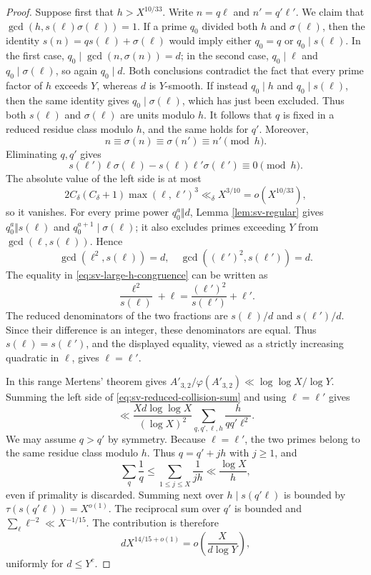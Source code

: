 \documentclass[11pt,letterpaper,reqno]{amsart}
\numberwithin{equation}{section}
\theoremstyle{remark}
\newcommand{\1}{\mathbf 1}
\renewcommand{\leq}{\leqslant}
\renewcommand{\geq}{\geqslant}
\begin{document}
\begin{proof}
Suppose first that $h>X^{10/33}$. Write $n=q\ell$ and $n'=q'\ell'$. We claim that
$\gcd(h,s(\ell)\sigma(\ell))=1$. If a prime $q_0$ divided both $h$
and $\sigma(\ell)$, then the identity
$s(n)=q s(\ell)+\sigma(\ell)$ would imply either $q_0=q$ or
$q_0\mid s(\ell)$. In the first case,
$q_0\mid\gcd(n,\sigma(n))=d$; in the second case,
$q_0\mid\ell$ and $q_0\mid\sigma(\ell)$, so again $q_0\mid d$.
Both conclusions contradict the fact that every prime factor of $h$ exceeds
$Y$, whereas $d$ is $Y$-smooth. If instead $q_0\mid h$ and
$q_0\mid s(\ell)$, then the same identity gives
$q_0\mid\sigma(\ell)$, which has just been excluded. Thus both
$s(\ell)$ and $\sigma(\ell)$ are units modulo $h$. It follows that
$q$ is fixed in a reduced residue class modulo $h$, and the same holds for
$q'$. Moreover,
\[
 n\equiv\sigma(n)\equiv\sigma(n')\equiv n'\pmod h.
\]
Eliminating $q,q'$ gives
\begin{equation}\label{eq:sv-large-h-congruence}
 s(\ell')\ell\sigma(\ell)-s(\ell)\ell'\sigma(\ell')
 \equiv0\pmod h.
\end{equation}
The absolute value of the left side is at most
\[
 2C_\delta(C_\delta+1)\max(\ell,\ell')^3
 \ll_\delta X^{3/10}=o(X^{10/33}),
\]
so it vanishes. For every prime power $q_0^a\Vert d$,
Lemma \ref{lem:sv-regular} gives
$q_0^a\Vert s(\ell)$ and $q_0^{a+1}\mid\sigma(\ell)$; it also excludes
primes exceeding $Y$ from $\gcd(\ell,s(\ell))$. Hence
\[
 \gcd(\ell^2,s(\ell))=d,
 \quad
 \gcd((\ell')^2,s(\ell'))=d.
\]
The equality in \eqref{eq:sv-large-h-congruence} can be written as
\[
 \frac{\ell^2}{s(\ell)}+\ell
 =\frac{(\ell')^2}{s(\ell')}+\ell'.
\]
The reduced denominators of the two fractions are $s(\ell)/d$ and
$s(\ell')/d$. Since their difference is an integer, these denominators
are equal. Thus $s(\ell)=s(\ell')$, and the displayed
equality, viewed as a strictly increasing quadratic in $\ell$, gives
$\ell=\ell'$.

In this range Mertens' theorem gives
$A'_{3,2}/\varphi(A'_{3,2})\ll\log\log X/\log Y$. Summing the left side of
\eqref{eq:sv-reduced-collision-sum} and using $\ell=\ell'$ gives
\[
 \ll\frac{Xd\log\log X}{(\log X)^2}
 \sum_{q,q',\ell,h}\frac{h}{qq'\ell^2}.
\]
We may assume $q>q'$ by symmetry. Because $\ell=\ell'$, the two primes
belong to the same residue class modulo $h$. Thus $q=q'+jh$ with $j\geq1$,
and
\[
 \sum_q\frac1q\leq\sum_{1\leq j\leq X}\frac1{jh}
 \ll\frac{\log X}{h},
\]
even if primality is discarded. Summing next
over $h\mid s(q'\ell)$ is bounded by
$\tau(s(q'\ell))=X^{o(1)}$. The reciprocal sum over $q'$ is bounded and
$\sum_\ell\ell^{-2}\ll X^{-1/15}$. The contribution is therefore
\[
 dX^{14/15+o(1)}=o\!\left(\frac{X}{d\log Y}\right),
\]
uniformly for $d\leq Y^c$.


\end{proof}
\end{document}
